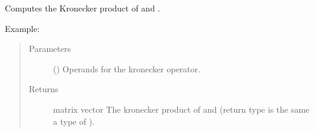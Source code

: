 \documentclass[letterpaper,10pt,english]{sphinxmanual}
\begin{document}
\begin{fulllineitems}
\label{\detokenize{run_circuit:run_circuit.kronecker}}
Computes the Kronecker product of  and .
\begin{description}
\item[{Example:}] \leavevmode
{}%
\begin{sphinxVerbatim}[commandchars=\\\{\},formatcom=\footnotesize]
  \PYG{p}{[}\PYG{p}{[}\PYG{p}{]}\PYG{p}{[}\PYG{p}{]}\PYG{p}{]}
  \PYG{p}{[}\PYG{p}{[}\PYG{p}{]}\PYG{p}{[}\PYG{p}{]}\PYG{p}{]}
\end{sphinxVerbatim}

\end{description}
\begin{quote}\begin{description}
\item[{Parameters}] \leavevmode
{}\sphinxstyleliteralstrong{\sphinxupquote{,}} (\sphinxstyleliteralemphasis{\sphinxupquote{,}}) \textendash{} Operands for the kronecker operator.

\item[{Returns}] \leavevmode
matrix  vector \textendash{}  The kronecker product of  and  
(return type is the same a type of ).

\end{description}\end{quote}

\end{fulllineitems}
\end{document}

